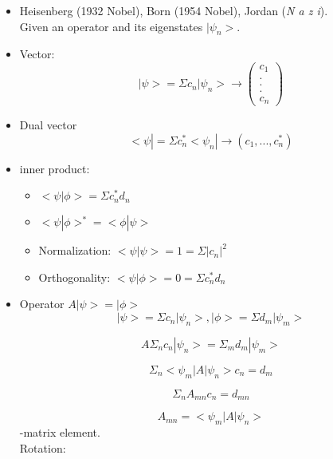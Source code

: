 \documentclass[12pt,a4paper]{article}
\begin{document}
\begin{itemize}

\item Heisenberg (1932 Nobel), Born (1954 Nobel), Jordan (\emph{N a z i}).\\ Given an operator and its eigenstates $| \psi _n >$.

\item Vector:  
\[
| \psi > = \Sigma c_n |\psi _n > \to 
\begin{pmatrix}
c_1 \\
. \\
. \\
. \\
c_n
\end{pmatrix}
\]

\item Dual vector
\[
< \psi | = \Sigma c_n ^{*} < \psi _n | \to (c_1,...,c_n ^{*})
\]

\item inner product:\\
\begin{itemize}

\item $< \psi | \phi > = \Sigma c_n ^{*} d_n$

\item $< \psi | \phi > ^{*} = < \phi | \psi >$

\item Normalization: $ < \psi | \psi > = 1 = \Sigma |c_n|^2$

\item Orthogonality: $< \psi | \phi > = 0 = \Sigma c_n ^* d_n$

\end{itemize}

\item Operator $A | \psi >= | \phi >$
\[
| \psi > = \Sigma c_n | \psi _n >, | \phi > = \Sigma d_m | \psi _m >
\]

\[
A \Sigma _n c_n | \psi _n > = \Sigma _m d_m | \psi _m >
\]

\[
\Sigma _n < \psi _m |A| \psi _n > c_n = d_m
\]

\[
\Sigma _n A_{mn} c_n = d_{mn}
\]

$$A_{mn}= < \psi _m |A| \psi _n >$$-matrix element.\\

Rotation:


\end{itemize}
\end{document}
